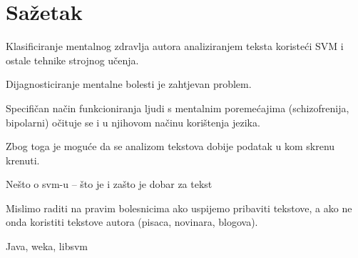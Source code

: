 \documentclass[a4paper]{article}
\begin{document}
 
\section{Sažetak}
Klasificiranje mentalnog zdravlja autora analiziranjem teksta koristeći SVM i ostale
tehnike strojnog učenja. 

Dijagnosticiranje mentalne bolesti je zahtjevan problem.

Specifičan način funkcioniranja ljudi s mentalnim poremećajima (schizofrenija, bipolarni) očituje
se i u njihovom načinu korištenja jezika.

Zbog toga je moguće da se analizom tekstova dobije podatak u kom skrenu krenuti.

Nešto o svm-u  -- što je i zašto je dobar za tekst

Mislimo raditi na pravim bolesnicima ako uspijemo pribaviti tekstove, a ako ne onda 
koristiti tekstove autora (pisaca, novinara, blogova).

Java, weka, libsvm
\end{document}
